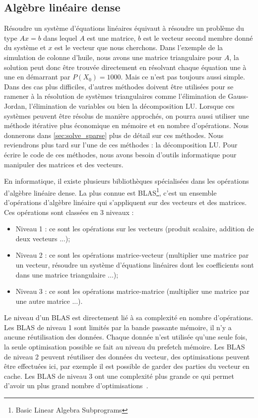 \subsection{Algèbre linéaire dense}
Résoudre un système d'équations linéaires équivaut à résoudre un problème du type $Ax=b$ dans lequel $A$ est une matrice, $b$ est le vecteur second membre donné du système et $x$ est le vecteur que nous cherchons.
%
Dans l'exemple de la simulation de colonne d'huile, nous avons une matrice triangulaire pour $A$, la solution peut donc être trouvée directement en résolvant chaque équation une à une en démarrant par $P(X_0) = 1000$.
%
Mais ce n'est pas toujours aussi simple.
%
Dans des cas plus difficiles, d'autres méthodes doivent être utilisées pour se ramener à la résolution de systèmes triangulaires comme l'élimination de Gauss-Jordan, l'élimination de variables ou bien la décomposition LU.
%
Lorsque ces systèmes peuvent être résolus de manière approchés, on pourra aussi utiliser une méthode itérative plus économique en mémoire et en nombre d'opérations.
%
Nous donnerons dans \ref{sec:solve_sparse} plus de détail sur ces méthodes.
%
Nous reviendrons plus tard sur l'une de ces méthodes : la décomposition LU.
%
Pour écrire le code de ces méthodes, nous avons besoin d'outils informatique pour manipuler des matrices et des vecteurs.


En informatique, il existe plusieurs bibliothèques spécialisées dans les opérations d'algèbre linéaire dense.
%
La plus connue est BLAS\footnote{Basic Linear Algebra Subprograms}, c'est un ensemble d'opérations d'algèbre linéaire qui s'appliquent sur des vecteurs et des matrices.
%
Ces opérations sont classées en 3 niveaux :
\begin{itemize}
  \item Niveau 1 : ce sont les opérations sur les vecteurs (produit scalaire, addition de deux vecteurs ...);
  \item Niveau 2 : ce sont les opérations matrice-vecteur (multiplier une matrice par un vecteur, résoudre un système d'équations linéaires dont les coefficients sont dans une matrice triangulaire ...);
  \item Niveau 3 : ce sont les opérations matrice-matrice (multiplier une matrice par une autre matrice ...).
\end{itemize}
%
Le niveau d'un BLAS est directement lié à sa complexité en nombre d'opérations.
%
Les BLAS de niveau 1 sont limités par la bande passante mémoire, il n'y a aucune réutilisation des données.
%
Chaque donnée n'est utilisée qu'une seule fois, la seule optimisation possible se fait au niveau du prefetch mémoire.
%
Les BLAS de niveau 2 peuvent réutiliser des données du vecteur, des optimisations peuvent être effectuées ici, par exemple il est possible de garder des parties du vecteur en cache.
%
Les BLAS de niveau 3 ont une complexité plus grande ce qui permet d'avoir un plus grand nombre d'optimisations~\cite{blas3_opt}.



